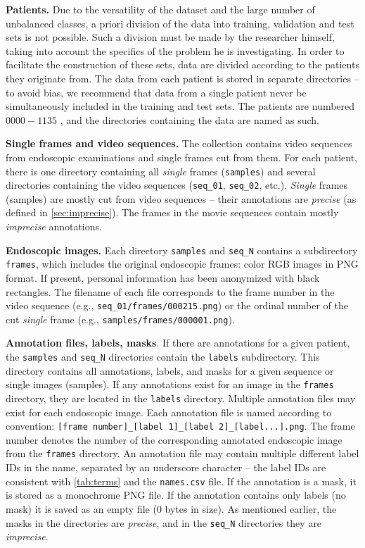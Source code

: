 \documentclass[preprint]{article}
\begin{document}
\textbf{Patients.} Due to the versatility of the dataset and the large number of unbalanced classes, a priori division of the data into training, validation and test sets is not possible. Such a division must be made by the researcher himself, taking into account the specifics of the problem he is investigating. In order to facilitate the construction of these sets, data are divided according to the patients they originate from. The data from each patient is stored in separate directories -- to avoid bias, we recommend that data from a single patient never be simultaneously included in the training and test sets. The patients are numbered $0000 - 1135$ , and the directories containing the data are named as such.



\textbf{Single frames and video sequences.} The collection contains video sequences from endoscopic examinations and single frames cut from them. For each patient, there is one directory containing all \textit{single} frames (\texttt{samples}) and several directories containing the video sequences (\texttt{seq\_01}, \texttt{seq\_02}, etc.). \textit{Single} frames (samples) are mostly cut from video sequences -- their annotations are \textit{precise} (as defined in \cref{sec:imprecise}). The frames in the movie sequences contain mostly \textit{imprecise} annotations.


\textbf{Endoscopic images.} Each directory \texttt{samples} and \texttt{seq\_N} contains a subdirectory \texttt{frames}, which includes the original endoscopic frames: color RGB images in PNG format. If present, personal information has been anonymized with black rectangles. The filename of each file corresponds to the frame number in the video sequence (e.g., \texttt{seq\_01/frames/000215.png}) or the ordinal number of the cut \textit{single} frame (e.g., \texttt{samples/frames/000001.png}).



\textbf{Annotation files, labels, masks}. If there are annotations for a given patient, the \texttt{samples} and \texttt{seq\_N} directories contain the \texttt{labels} subdirectory. This directory contains all annotations, labels, and masks for a given sequence or single images (samples). If any annotations exist for an image in the \texttt{frames} directory, they are located in the \texttt{labels} directory. Multiple annotation files may exist for each endoscopic image. Each annotation file is named according to convention: \texttt{[frame number]\_[label 1]\_[label 2]\_[label...].png}. The frame number denotes the number of the corresponding annotated endoscopic image from the \texttt{frames} directory. An annotation file may contain multiple different label IDs in the name, separated by an underscore character -- the label IDs are consistent with \cref{tab:terms} and the \texttt{names.csv} file. If the annotation is a mask, it is stored as a monochrome PNG file. If the annotation contains only labels (no mask) it is saved as an empty file (0 bytes in size). As mentioned earlier, the masks in the  directories are \textit{precise}, and in the \texttt{seq\_N} directories they are \textit{imprecise}.
\end{document}

